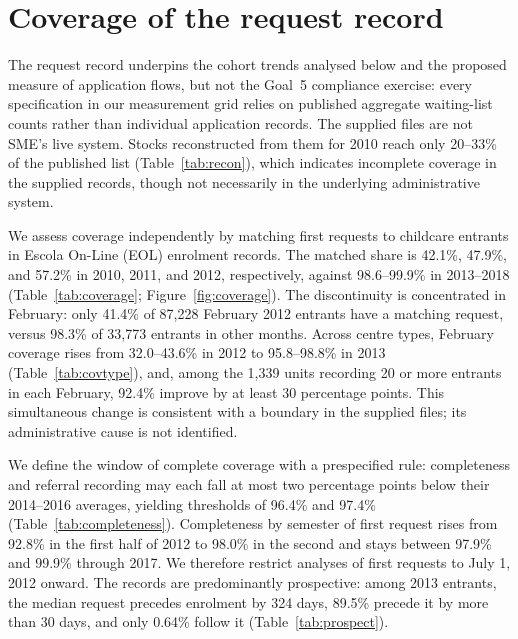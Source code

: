 
\section{Coverage of the request record}\label{sec:coverage}

The request record underpins the cohort trends analysed below and the proposed measure of application flows, but not the Goal~5 compliance exercise: every specification in our measurement grid relies on published aggregate waiting-list counts rather than individual application records. The supplied files are not SME's live system. Stocks reconstructed from them for 2010 reach only 20--33\% of the published list (Table~\ref{tab:recon}), which indicates incomplete coverage in the supplied records, though not necessarily in the underlying administrative system.

We assess coverage independently by matching first requests to childcare entrants in Escola On-Line (EOL) enrolment records. The matched share is 42.1\%, 47.9\%, and 57.2\% in 2010, 2011, and 2012, respectively, against 98.6--99.9\% in 2013--2018 (Table~\ref{tab:coverage}; Figure~\ref{fig:coverage}). The discontinuity is concentrated in February: only 41.4\% of 87,228 February 2012 entrants have a matching request, versus 98.3\% of 33,773 entrants in other months. Across centre types, February coverage rises from 32.0--43.6\% in 2012 to 95.8--98.8\% in 2013 (Table~\ref{tab:covtype}), and, among the 1,339 units recording 20 or more entrants in each February, 92.4\% improve by at least 30 percentage points. This simultaneous change is consistent with a boundary in the supplied files; its administrative cause is not identified.

We define the window of complete coverage with a prespecified rule: completeness and referral recording may each fall at most two percentage points below their 2014--2016 averages, yielding thresholds of 96.4\% and 97.4\% (Table~\ref{tab:completeness}). Completeness by semester of first request rises from 92.8\% in the first half of 2012 to 98.0\% in the second and stays between 97.9\% and 99.9\% through 2017. We therefore restrict analyses of first requests to July 1, 2012 onward. The records are predominantly prospective: among 2013 entrants, the median request precedes enrolment by 324 days, 89.5\% precede it by more than 30 days, and only 0.64\% follow it (Table~\ref{tab:prospect}).

